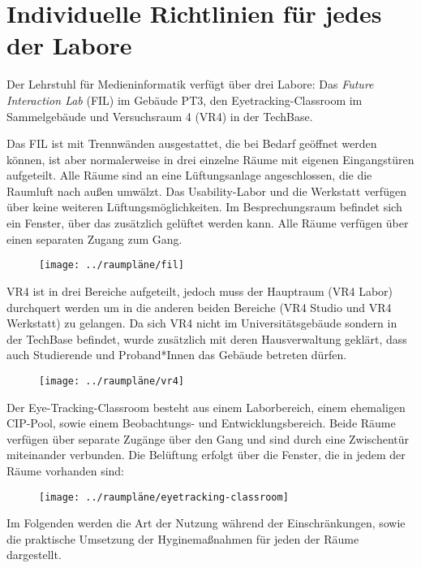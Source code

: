 \section{Individuelle Richtlinien für jedes der Labore}

Der Lehrstuhl für Medieninformatik verfügt über drei Labore: Das \emph{Future Interaction Lab} (FIL) im Gebäude PT3, den Eyetracking-Classroom im Sammelgebäude und Versuchsraum 4 (VR4) in der TechBase.

\medskip
\noindent
Das FIL ist mit Trennwänden ausgestattet, die bei Bedarf geöffnet werden können, ist aber normalerweise in drei einzelne Räume mit eigenen Eingangstüren aufgeteilt.
Alle Räume sind an eine Lüftungsanlage angeschlossen, die die Raumluft nach außen umwälzt.
Das Usability-Labor und die Werkstatt verfügen über keine weiteren Lüftungsmöglichkeiten.
Im Besprechungsraum befindet sich ein Fenster, über das zusätzlich gelüftet werden kann.
Alle Räume verfügen über einen separaten Zugang zum Gang. 

\medskip
\begin{figure}[h!]
\centering
\texttt{[image: ../raumpläne/fil]}
\end{figure}

\medskip
\noindent
VR4 ist in drei Bereiche aufgeteilt, jedoch muss der Hauptraum (VR4 Labor) durchquert werden um in die anderen beiden Bereiche (VR4 Studio und VR4 Werkstatt) zu gelangen.
Da sich VR4 nicht im Universitätsgebäude sondern in der TechBase befindet, wurde zusätzlich mit deren Hausverwaltung geklärt, dass auch Studierende und Proband*Innen das Gebäude betreten dürfen.

\medskip
\begin{figure}[h!]
\centering
\texttt{[image: ../raumpläne/vr4]}
\end{figure}

\medskip
\noindent
Der Eye-Tracking-Classroom besteht aus einem Laborbereich, einem ehemaligen CIP-Pool, sowie einem Beobachtungs- und Entwicklungsbereich.
Beide Räume verfügen über separate Zugänge über den Gang und sind durch eine Zwischentür miteinander verbunden.
Die Belüftung erfolgt über die Fenster, die in jedem der Räume vorhanden sind:

\medskip
\begin{figure}[h!]
\centering
\texttt{[image: ../raumpläne/eyetracking-classroom]}
\end{figure}

\medskip
\noindent
Im Folgenden werden die Art der Nutzung während der Einschränkungen, sowie die praktische Umsetzung der Hyginemaßnahmen für jeden der Räume dargestellt.

